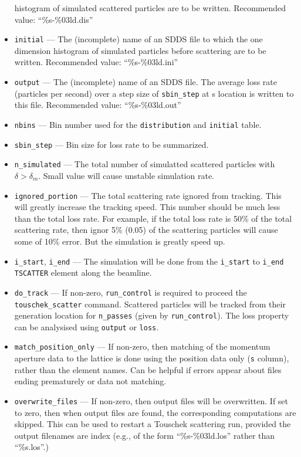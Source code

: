 \documentclass[11pt]{article}
\begin{document}
\begin{itemize}
   histogram of simulated scattered particles are to be written. Recommended value: ``\%s-\%03ld.dis'' 
   \item \verb|initial| --- The (incomplete) name of an SDDS file to which the one dimension 
   histogram of simulated particles before scattering are to be written. Recommended value: ``\%s-\%03ld.ini''
   \item \verb|output| --- The (incomplete) name of an SDDS file. The average loss rate (particles per second) over a step size of 
   \verb|sbin_step| at s location is written to this file. Recommended value: ``\%s-\%03ld.out'' 
   \item \verb|nbins| --- Bin number used for the \verb|distribution| and \verb|initial| table.
   \item \verb|sbin_step| --- Bin size for loss rate to be summarized.
   \item \verb|n_simulated| --- The total number of simulatted scattered particles with $\delta>\delta_m$. Small
   value will cause unstable simulation rate.
   \item \verb|ignored_portion| --- The total scattering rate ignored from tracking. This will greatly 
   increase the tracking speed. This number should be much less than the total loss rate. For example, if
   the total loss rate is 50\% of the total scattering rate, then ignor 5\% (0.05) of the scattering particles
   will cause some of 10\% error. But the simulation is greatly speed up.
   \item \verb|i_start|, \verb|i_end| --- The simulation will be done from the \verb|i_start| to \verb|i_end|
   \verb|TSCATTER| element along the beamline.    
   \item \verb|do_track| --- If non-zero, \verb |run_control| is
   required to proceed the \verb |touschek_scatter| command. Scattered
   particles will be tracked from their generation location for \verb|n_passes| (given by \verb|run_control|). 
   The loss property can be analysised using \verb|output| or \verb|loss|.
   \item \verb|match_position_only| --- If non-zero, then matching of the momentum aperture data to the lattice
     is done using the position data only (\verb|s| column), rather than the element names.  Can be helpful if
     errors appear about files ending prematurely or data not matching.
   \item \verb|overwrite_files| --- If non-zero, then output files will be overwritten.  If set to zero, then
     when output files are found, the corresponding computations are skipped.  This can be used to restart a
     Touschek scattering run, provided the output filenames are index (e.g., of the form ``\%s-\%03ld.los''
     rather than ``\%s.los''.)
\end{itemize}
\end{document}
